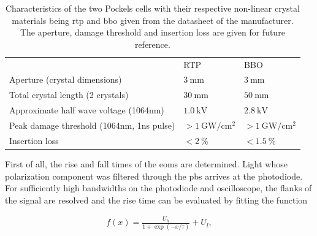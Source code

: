 \begin{table}[tbp]%
\centering
\begin{tabular}{p{6cm} l l}
	\toprule \toprule
                                                                                     & RTP                                       & BBO \\ \thickhline%
Aperture (crystal dimensions)                                                        & $\SI{3}{\milli\meter}$                    & $\SI{3}{\milli\meter}$   \\ \midrule
Total crystal length (2 crystals)                                                    & $\SI{30}{\milli\meter}$                   & $\SI{50}{\milli\meter}$    \\ \midrule
Approximate half wave voltage \newline (1064nm)    & $\SI{1.0}{\kilo \volt}$                   & $\SI{2.8}{\kilo\volt}$    \\ \midrule
Peak damage threshold (1064nm, \newline 1ns pulse) & $> \SI{1}{\giga \watt \per \cm \squared}$ & $> \SI{1}{\giga \watt \per \cm \squared}$   \\ \midrule
Insertion loss                                                                       & $< \SI{2}{\percent}$                      & $< \SI{1.5}{\percent} $ \\ \bottomrule \bottomrule
\end{tabular}
\caption{Characteristics of the two Pockels cells with their respective non-linear crystal materials being \ac{rtp} and \ac{bbo} given from the datasheet of the manufacturer. The aperture, damage threshold and insertion loss are given for future reference.}
\label{tbl:eom_crystals}
\end{table}

First of all, the rise and fall times of the \acp{eom} are determined. Light whose polarization component was filtered through the \ac{pbs} arrives at the photodiode. For sufficiently high bandwidths on the photodiode and oscilloscope, the flanks of the signal are resolved and the rise time can be evaluated by fitting the function

\begin{align}
	f(x) = \frac{U_h}{1 + \exp{(-x/\tau)}} + U_l,
\end{align}

